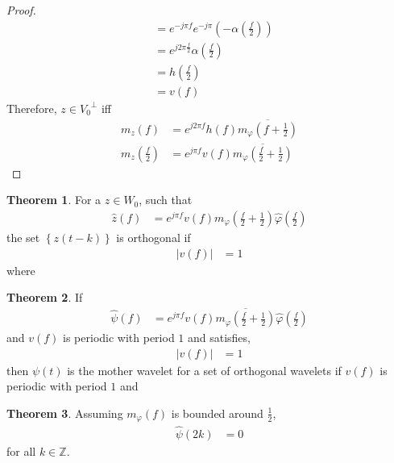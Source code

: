 \documentclass[titlepage, fleqn, a4paper, 12pt, twoside]{article}
\theoremstyle{definition}
\theoremstyle{theorem}
\newtheorem{theorem}{Theorem}
\begin{document}
\begin{proof}
\begin{align*}
		&= e^{-j \pi f} e^{-j \pi} \left( -\alpha\left( \frac{f}{2} \right) \right)\\
		&= e^{j 2 \pi \frac{f}{2}} \alpha\left( \frac{f}{2} \right)\\
		&= h\left( \frac{f}{2} \right)\\
		&= v(f)
	\end{align*}
	Therefore, $z \in {V_0}^{\perp}$ iff
	\begin{align*}
		m_z(f) &= e^{j 2 \pi f} h(f) \overline{m_{\varphi}\left( f + \frac{1}{2} \right)}\\
		m_z\left( \frac{f}{2} \right) &= e^{j \pi f} v(f) \overline{m_{\varphi}\left( \frac{f}{2} + \frac{1}{2} \right)}
	\end{align*}
\end{proof}

\begin{theorem}
	For a $z \in W_0$, such that
	\begin{align*}
		\hat{z}(f) &= e^{j \pi f} v(f) m_{\varphi}\left( \frac{f}{2} + \frac{1}{2} \right) \hat{\varphi}\left( \frac{f}{2} \right)
	\end{align*}
	the set $\left\{ z(t - k) \right\}$ is orthogonal if
	\begin{align*}
		\left| v(f) \right| &= 1
	\end{align*}
	where
\end{theorem}

\begin{theorem}
	If
	\begin{align*}
		\hat{\psi}(f) &= e^{j \pi f} v(f) \overline{m_{\varphi}\left( \frac{f}{2} + \frac{1}{2} \right)} \hat{\varphi}\left( \frac{f}{2} \right)
	\end{align*}
	and $v(f)$ is periodic with period $1$ and satisfies,
	\begin{align*}
		\left| v(f) \right| &= 1
	\end{align*}
	then $\psi(t)$ is the mother wavelet for a set of orthogonal wavelets if $v(f)$ is periodic with period $1$ and
\end{theorem}

\begin{theorem}
	Assuming $m_{\varphi}(f)$ is bounded around $\frac{1}{2}$,
	\begin{align*}
		\hat{\psi}(2 k) &= 0
	\end{align*}
	for all $k \in \mathbb{Z}$.
\end{theorem}
\end{document}
